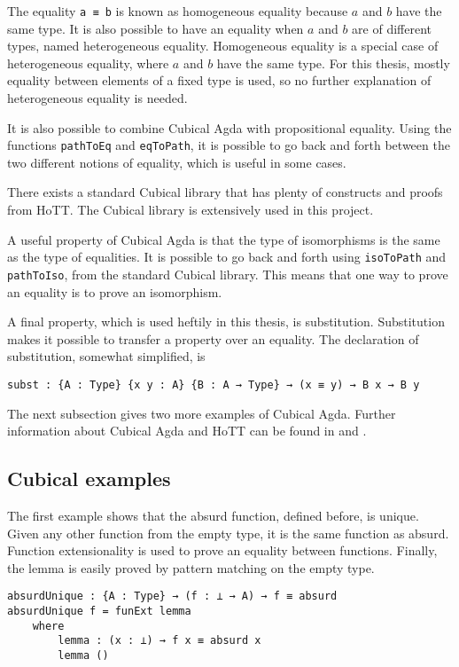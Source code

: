 The equality \texttt{a ≡ b} is known as homogeneous equality because $a$ and $b$ have the same type. It is also possible to have an equality when $a$ and $b$ are of different types, named heterogeneous equality. Homogeneous equality is a special case of heterogeneous equality, where $a$ and $b$ have the same type. For this thesis, mostly equality between elements of a fixed type is used, so no further explanation of heterogeneous equality is needed.

It is also possible to combine Cubical Agda with propositional equality. Using the functions \texttt{pathToEq} and \texttt{eqToPath}, it is possible to go back and forth between the two different notions of equality, which is useful in some cases.

There exists a standard Cubical library \cite{cubicalLibrary} that has plenty of constructs and proofs from HoTT. The Cubical library is extensively used in this project.

A useful property of Cubical Agda is that the type of isomorphisms is the same as the type of equalities. It is possible to go back and forth using \texttt{isoToPath} and \texttt{pathToIso}, from the standard Cubical library. This means that one way to prove an equality is to prove an isomorphism.

A final property, which is used heftily in this thesis, is substitution. Substitution makes it possible to transfer a property over an equality. The declaration of substitution, somewhat simplified, is 

\begin{verbatim}
subst : {A : Type} {x y : A} {B : A → Type} → (x ≡ y) → B x → B y
\end{verbatim}

The next subsection gives two more examples of Cubical Agda. Further information about Cubical Agda and HoTT can be found in  \cite{cubicalPaper} and \cite{hottBook}.

\subsection{Cubical examples}
The first example shows that the absurd function, defined before, is unique. Given any other function from the empty type, it is the same function as absurd. Function extensionality is used to prove an equality between functions. Finally, the lemma is easily proved by pattern matching on the empty type.

\begin{verbatim}
absurdUnique : {A : Type} → (f : ⊥ → A) → f ≡ absurd
absurdUnique f = funExt lemma
    where
        lemma : (x : ⊥) → f x ≡ absurd x
        lemma ()
\end{verbatim}

